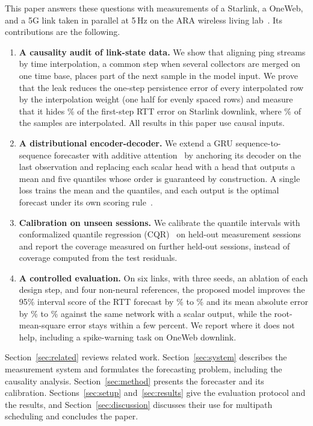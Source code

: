 This paper answers these questions with measurements of a Starlink, a OneWeb, and a 5G link taken in parallel at 5\,Hz on the ARA wireless living lab~\cite{islam2025design}. Its contributions are the following.
\begin{enumerate}
  \item \textbf{A causality audit of link-state data.} We show that aligning ping streams by time interpolation, a common step when several collectors are merged on one time base, places part of the next sample in the model input. We prove that the leak reduces the one-step persistence error of every interpolated row by the interpolation weight (one half for evenly spaced rows) and measure that it hides \AuditPersHonePct\% of the first-step RTT error on Starlink downlink, where \InterpFracSLDL\% of the samples are interpolated. All results in this paper use causal inputs.
  \item \textbf{A distributional encoder-decoder.} We extend a GRU sequence-to-sequence forecaster with additive attention~\cite{cho2014learning,bahdanau2015neural} by anchoring its decoder on the last observation and replacing each scalar head with a head that outputs a mean and five quantiles whose order is guaranteed by construction. A single loss trains the mean and the quantiles, and each output is the optimal forecast under its own scoring rule~\cite{gneiting2011making}.
  \item \textbf{Calibration on unseen sessions.} We calibrate the quantile intervals with conformalized quantile regression (CQR)~\cite{romano2019conformalized} on held-out measurement sessions and report the coverage measured on further held-out sessions, instead of coverage computed from the test residuals.
  \item \textbf{A controlled evaluation.} On six links, with three seeds, an ablation of each design step, and four non-neural references, the proposed model improves the 95\% interval score of the RTT forecast by \ChgMISWorst\% to \ChgMISBest\% and its mean absolute error by \ChgMAEWorst\% to \ChgMAEBest\% against the same network with a scalar output, while the root-mean-square error stays within a few percent. We report where it does not help, including a spike-warning task on OneWeb downlink.
\end{enumerate}

Section~\ref{sec:related} reviews related work. Section~\ref{sec:system} describes the measurement system and formulates the forecasting problem, including the causality analysis. Section~\ref{sec:method} presents the forecaster and its calibration. Sections~\ref{sec:setup} and~\ref{sec:results} give the evaluation protocol and the results, and Section~\ref{sec:discussion} discusses their use for multipath scheduling and concludes the paper.
